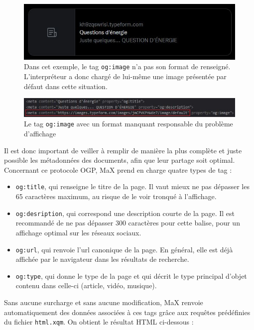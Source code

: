 \documentclass[a4paper,12pt,twoside]{book}
\begin{document}
\begin{figure}[H]
    \centering
    \includegraphics[width=12cm]{img/partie_2/poitiers.JPG}
    \caption{Dans cet exemple, le tag \texttt{og:image} n'a pas son format de renseigné. L'interpréteur a donc chargé de lui-même une image présentée par défaut dans cette situation.}
    \label{bad_figure}
\end{figure}

\begin{figure}[H]
    \centering
    \includegraphics[width=12cm]{img/partie_2/og_image_bad.JPG}
    \caption{Le tag \texttt{og:image} avec un format manquant responsable du problème d'affichage}
    \label{tag_og}
\end{figure}


Il est donc important de veiller à remplir de manière la plus complète et juste possible les métadonnées des documents, afin que leur partage soit optimal.
Concernant ce protocole \acrshort{OGP}, MaX prend en charge quatre types de tag :

\begin{itemize}
    \item \texttt{og:title}, qui renseigne le titre de la page. Il vaut mieux ne pas dépasser les 65 caractères maximum, au risque de le voir tronqué à l'affichage.
    \item \texttt{og:desription}, qui correspond une description courte de la page. Il est recommandé de ne pas dépasser 300 caractères pour cette balise, pour un affichage optimal sur les réseaux sociaux.
    \item \texttt{og:url}, qui renvoie l'url canonique de la page. En général, elle est déjà affichée par le navigateur dans les résultats de recherche.
    \item \texttt{og:type}, qui donne le type de la page et qui décrit le type principal d'objet contenu dans celle-ci (article, vidéo, musique).
\end{itemize}

Sans aucune surcharge et sans aucune modification, MaX renvoie automatiquement des données associées à ces tags grâce aux requêtes prédéfinies du fichier \texttt{html.xqm}. On obtient le résultat \acrshort{HTML} ci-dessous :
\end{document}
